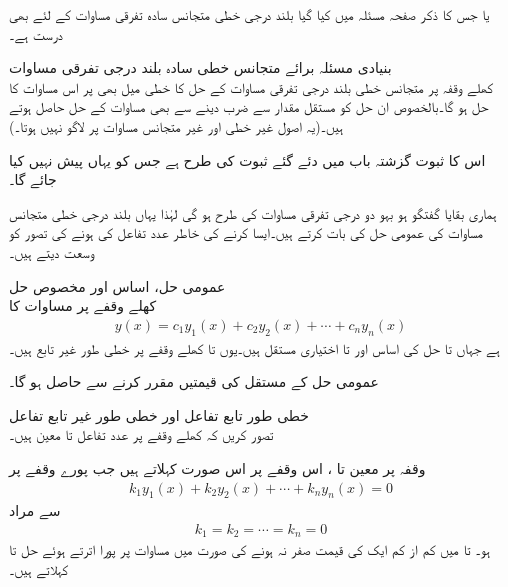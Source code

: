  یا  جس کا ذکر صفحہ  مسئلہ  میں کیا گیا بلند درجی خطی متجانس سادہ تفرقی مساوات کے لئے بھی درست ہے۔

\quad بنیادی مسئلہ برائے متجانس خطی سادہ بلند درجی تفرقی مساوات\\
کھلے وقفہ  پر متجانس خطی بلند درجی تفرقی مساوات  کے حل کا خطی میل بھی  پر اس مساوات کا حل ہو گا۔بالخصوص ان حل کو مستقل مقدار سے ضرب دینے سے بھی مساوات کے حل حاصل ہوتے ہیں۔(یہ اصول غیر خطی اور  غیر متجانس مساوات پر لاگو نہیں ہوتا۔)

اس کا ثبوت گزشتہ باب میں دئے گئے ثبوت کی طرح ہے جس کو یہاں پیش نہیں کیا جائے گا۔

ہماری بقایا گفتگو ہو بہو دو درجی تفرقی مساوات کی طرح ہو گی لہٰذا یہاں بلند درجی خطی متجانس مساوات کی عمومی حل کی بات کرتے ہیں۔ایسا کرنے کی خاطر  عدد تفاعل کی   ہونے کی تصور کو وسعت دیتے ہیں۔

\quad عمومی حل، اساس اور مخصوص حل\\
کھلے وقفے  پر مساوات  کا 
\begin{align}
y(x)=c_1y_1(x)+c_2y_2(x)+\cdots +c_ny_n(x)
\end{align}
ہے جہاں  تا  حل کی اساس اور  تا  اختیاری مستقل ہیں۔یوں  تا  کھلے وقفے پر خطی طور غیر تابع ہیں۔ 

عمومی حل کے مستقل کی قیمتیں مقرر کرنے سے  حاصل ہو گا۔

\quad خطی طور تابع تفاعل اور خطی طور غیر تابع تفاعل\\
تصور کریں کہ کھلے وقفے  پر   عدد تفاعل  تا  معین ہیں۔

 وقفہ  پر معین  تا ،  اس وقفے   پر اس صورت  کہلاتے ہیں جب پورے وقفے پر
\begin{align}\label{مساوات_سادہ_بلند_خطی_طور_غیر_تابع_الف}
k_1 y_1(x)+k_2 y_2(x)+\cdots+k_ny_n(x)=0
\end{align}
سے مراد 
\begin{align*}
k_1=k_2= \cdots =k_n=0 
\end{align*}
ہو۔ تا  میں  کم از کم ایک کی قیمت صفر نہ ہونے کی صورت میں مساوات  پر پورا اترتے ہوئے حل  تا   کہلاتے ہیں۔

